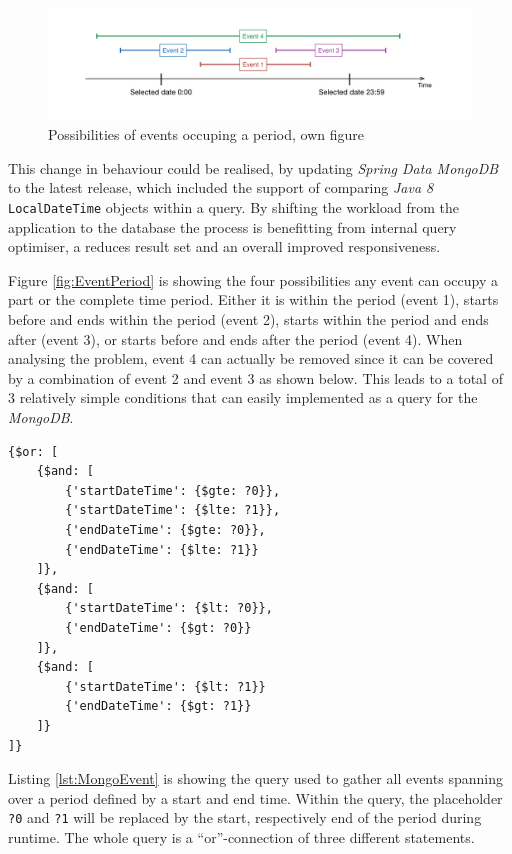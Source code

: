 \begin{figure}[h]
  	\centering
  	\includegraphics[width=0.9\linewidth]{./images/event-period.png}
  	\caption{Possibilities of events occuping a period, own figure}
	\label{fig:EventPeriod}
\end{figure}

This change in behaviour could be realised, by updating \emph{Spring Data MongoDB} to the latest release, which included the support of comparing \emph{Java 8} \texttt{LocalDateTime} objects within a query. By shifting the workload from the application to the database the process is benefitting from internal query optimiser, a reduces result set and an overall improved responsiveness. 

Figure \vref{fig:EventPeriod} is showing the four possibilities any event can occupy a part or the complete time period. Either it is within the period (event 1), starts before and ends within the period (event 2), starts within the period and ends after (event 3), or starts before and ends after the period (event 4). When analysing the problem, event 4 can actually be removed since it can be covered by a combination of event 2 and event 3 as shown below. This leads to a total of 3 relatively simple conditions that can easily implemented as a query for the \emph{MongoDB}.

\begin{lstlisting}[caption ={MongoDB query for getting events over a period}, label=lst:MongoEvent]
{$or: [
	{$and: [
		{'startDateTime': {$gte: ?0}},
		{'startDateTime': {$lte: ?1}},
		{'endDateTime': {$gte: ?0}},
		{'endDateTime': {$lte: ?1}}
	]},
	{$and: [
		{'startDateTime': {$lt: ?0}},
		{'endDateTime': {$gt: ?0}}
	]},
	{$and: [
		{'startDateTime': {$lt: ?1}}
		{'endDateTime': {$gt: ?1}}
	]}
]}
\end{lstlisting}

Listing \ref{lst:MongoEvent} is showing the query used to gather all events spanning over a period defined by a start and end time. Within the query, the placeholder \texttt{?0} and \texttt{?1} will be replaced by the start, respectively end of the period during runtime. The whole query is a \enquote{or}-connection of three different statements. 

